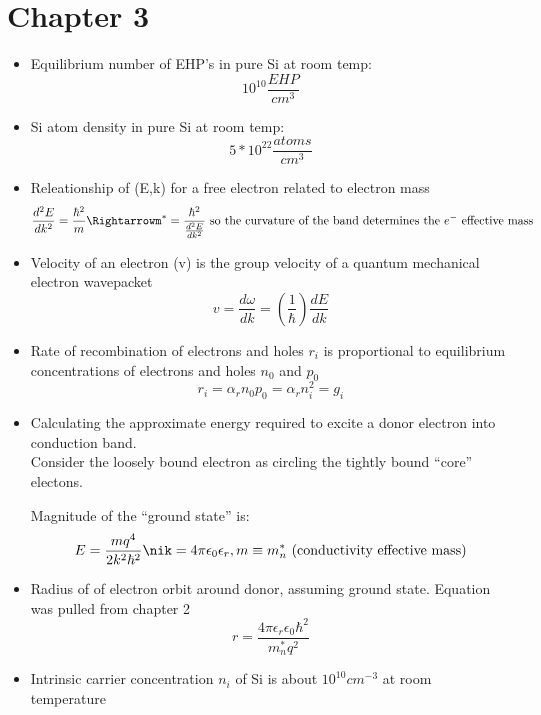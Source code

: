\documentclass{article}
\begin{document}
\section{Chapter 3}
\begin{itemize}
\item Equilibrium number of EHP's in pure Si at room temp: $$10^{10}\frac{EHP}{cm^3}$$
\item Si atom density in pure Si at room temp: $$5*10^{22}\frac{atoms}{cm^3}$$
\item Releationship of (E,k) for a free electron related to electron mass
  \begin{equation}
    \frac{d^{2}E}{dk^2}=\frac{\hbar^2}{m}\Rightarrowm^*=\frac{\hbar^2}{\frac{d^2E}{dk^2}}\text{~so~the~curvature~of~the~band~determines~the~}e^{-}\text{~effective~mass}
  \end{equation}
\item Velocity of an electron (v) is the group velocity of a quantum mechanical electron wavepacket
  \begin{equation}v=\frac{d\omega}{dk} = (\frac{1}{\hbar})\frac{dE}{dk}\end{equation}
\item Rate of recombination of electrons and holes $r_i$ is proportional to equilibrium concentrations of electrons and holes $n_0$ and $p_0$
  \begin{equation}r_i=\alpha_rn_0p_0=\alpha_rn_i^2=g_i\end{equation}
\item Calculating the approximate energy required to excite a donor electron into conduction band.  \\
  
  Consider the loosely bound electron as circling the tightly bound ``core'' electons.

  Magnitude of the ``ground state'' is:
  \begin{equation}E=\frac{mq^4}{2k^2\hbar^2}\nik=4\pi\epsilon_0\epsilon_r, m\equiv m_n^*\text{~(conductivity~effective~mass)}\end{equation}
\item Radius of of electron orbit around donor, assuming ground state.  Equation was pulled from chapter 2
  \begin{equation}r=\frac{4\pi\epsilon_r\epsilon_0\hbar^2}{m_n^*q^2}\end{equation} 
\item Intrinsic carrier concentration $n_i$ of Si is about $10^{10}cm^{-3}$ at room temperature
\end{itemize}
\end{document}
